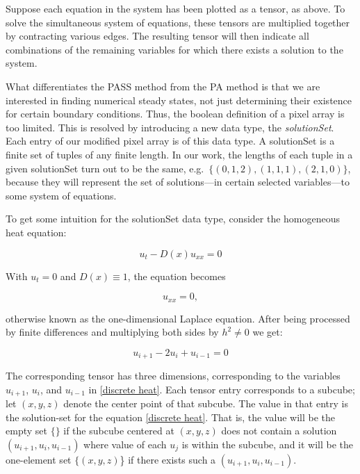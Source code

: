 \documentclass[11pt]{article}
\begin{document}
Suppose each equation in the system has been plotted as a tensor, as above. To solve the simultaneous system of equations, these tensors are multiplied together by contracting various edges. The resulting tensor will then indicate all combinations of the remaining variables for which there exists a solution to the system.

What differentiates the PASS method from the PA method is that we are interested in finding numerical steady states, not just determining their existence for certain boundary conditions. Thus, the boolean definition of a pixel array is too limited. This is resolved by introducing a new data type, the \textit{solutionSet}. Each entry of our modified pixel array is of this data type. A solutionSet is a finite set of tuples of any finite length. In our work, the lengths of each tuple in a given solutionSet turn out to be the same, e.g.\  $\{(0,1,2), (1,1,1), (2,1,0)\}$, because they will represent the set of solutions---in certain selected variables---to some system of equations.

To get some intuition for the solutionSet data type, consider the homogeneous heat equation:

\begin{equation*}
    \label{general homogeneous heat}
    u_t - D(x)u_{xx} = 0
\end{equation*}

\noindent With $u_t = 0$ and $D(x) \equiv 1$, the equation becomes

\begin{equation}
    \label{homogeneous heat}
    u_{xx} = 0,
\end{equation}

\noindent otherwise known as the one-dimensional Laplace equation. After being processed by finite differences and multiplying both sides by $h^2 \ne 0$ we get: 

\begin{equation}
    \label{discrete heat}
    u_{i+1} - 2u_i + u_{i-1} = 0
\end{equation}

\noindent The corresponding tensor has three dimensions, corresponding to the variables $u_{i+1}$, $u_i$, and $u_{i-1}$ in \cref{discrete heat}. Each tensor entry corresponds to a subcube; let $(x,y,z)$ denote the center point of that subcube. The value in that entry is the solution-set for the equation \cref{discrete heat}. That is, the value will be the empty set $\{\}$ if the subcube centered at $(x,y,z)$ does not contain a solution $(u_{i+1}, u_i, u_{i-1})$ where value of each $u_j$ is within the subcube, and it will be the one-element set $\{(x,y,z)$\} if there exists such a $(u_{i+1}, u_i, u_{i-1})$.
\end{document}
